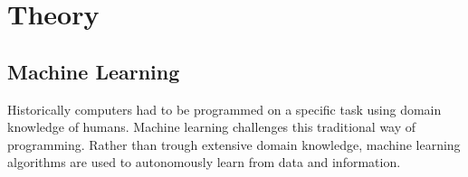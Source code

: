 \chapter{Theory}
\label{ch:Theory}
\section{Machine Learning}
Historically computers had to be programmed on a specific task using domain knowledge of humans. Machine learning challenges this traditional way of programming. Rather than trough extensive domain knowledge, machine learning algorithms are used to autonomously learn from data and information. 
\\

